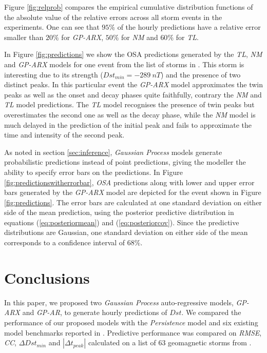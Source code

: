 \documentclass[referee,a4paper,12pt,traditabstract]{swsc}
\begin{document}
\begin{linenumbers}
Figure \ref{fig:relprob} compares the empirical cumulative distribution functions of the absolute value of the relative errors across all storm events in the experiments.  One can see that $95\%$ of the hourly predictions have a relative error smaller than $20\%$ for \emph{GP-ARX}, $50\%$ for \emph{NM} and $60\%$ for \emph{TL}.

In Figure \ref{fig:predictions} we show the OSA predictions generated by the \emph{TL}, \emph{NM} and \emph{GP-ARX} models for one event from the list of storms in \citet{Ji2012}. This storm is interesting due to its strength ($Dst_{min} = -289 \ nT$) and the presence of two distinct peaks. In this particular event the \emph{GP-ARX} model approximates the twin peaks as well as the onset and decay phases quite faithfully, contrary the \emph{NM} and \emph{TL} model predictions. The \emph{TL} model recognises the presence of twin peaks but overestimates the second one as well as the decay phase, while the \emph{NM} model is much delayed in the prediction of the initial peak and fails to approximate the time and intensity of the second peak.

As noted in section \ref{sec:inference}, \emph{Gaussian Process} models generate probabilistic predictions instead of point predictions, giving the modeller the ability to specify error bars on the predictions. In Figure \ref{fig:predictionswitherrorbar}, \emph{OSA} predictions along with lower and upper error bars generated by the \emph{GP-ARX} model are depicted for the event shown in Figure \ref{fig:predictions}. The error bars are calculated at one standard deviation on either side of the mean prediction, using the posterior predictive distribution in equations (\ref{eq:posteriormean}) and (\ref{eq:posteriorcov}). Since the predictive distributions are Gaussian, one standard deviation on either side of the mean corresponds to a confidence interval of $68\%$.



\section{Conclusions}

In this paper, we proposed two \emph{Gaussian Process} auto-regressive models, \emph{GP-ARX} and \emph{GP-AR}, to generate hourly predictions of $Dst$. We compared the performance of our proposed models with the \emph{Persistence} model and six existing model benchmarks reported in \citet{Ji2012}. Predictive performance was compared on \emph{RMSE}, \emph{CC}, $\Delta Dst_{min}$ and $|\Delta t_{peak}|$ calculated on a list of 63 geomagnetic storms from \cite{Ji2012}.


\end{linenumbers}
\end{document}
